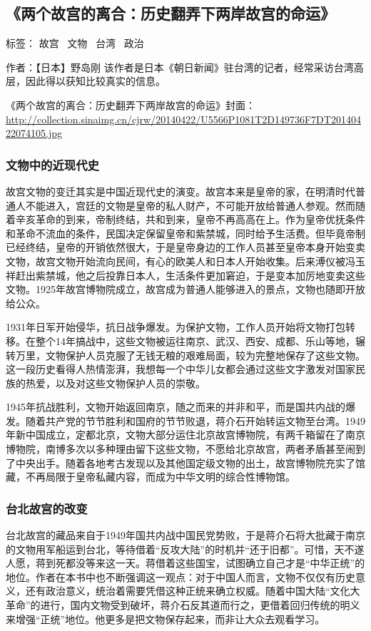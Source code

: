 \subsection{《两个故宫的离合：历史翻弄下两岸故宫的命运》}

标签： 故宫 \  文物 \  台湾 \  政治

作者：【日本】野岛刚
该作者是日本《朝日新闻》驻台湾的记者，经常采访台湾高层，因此得以获知比较真实的信息。

《两个故宫的离合：历史翻弄下两岸故宫的命运》封面：\url{http://collection.sinaimg.cn/cjrw/20140422/U5566P1081T2D149736F7DT20140422074105.jpg}

\subsubsection{文物中的近现代史}
故宫文物的变迁其实是中国近现代史的演变。故宫本来是皇帝的家，在明清时代普通人不能进入，宫廷的文物是皇帝的私人财产，不可能开放给普通人参观。然而随着辛亥革命的到来，帝制终结，共和到来，皇帝不再高高在上。作为皇帝优抚条件和革命不流血的条件，民国决定保留皇帝和紫禁城，同时给予生活费。但毕竟帝制已经终结，皇帝的开销依然很大，于是皇帝身边的工作人员甚至皇帝本身开始变卖文物，故宫文物开始流向民间，有心的欧美人和日本人开始收集。后来溥仪被冯玉祥赶出紫禁城，他之后投靠日本人，生活条件更加窘迫，于是变本加厉地变卖这些文物。1925年故宫博物院成立，故宫成为普通人能够进入的景点，文物也随即开放给公众。

1931年日军开始侵华，抗日战争爆发。为保护文物，工作人员开始将文物打包转移。在整个14年搞战中，这些文物被运往南京、武汉、西安、成都、乐山等地，辗转万里，文物保护人员克服了无钱无粮的艰难局面，较为完整地保存了这些文物。这一段历史看得人热情澎湃，我想每一个中华儿女都会通过这些文字激发对国家民族的热爱，以及对这些文物保护人员的崇敬。

1945年抗战胜利，文物开始返回南京，随之而来的并非和平，而是国共内战的爆发。随着共产党的节节胜利和国府的节节败退，蒋介石开始转运文物至台湾。1949年新中国成立，定都北京，文物大部分运住北京故宫博物院，有两千箱留在了南京博物院，南博多次以多种理由留下这些文物，不愿给北京故宫，两者矛盾甚至闹到了中央出手。随着各地考古发现以及其他国定级文物的出土，故宫博物院充实了馆藏，不再局限于皇帝私藏内容，而成为中华文明的综合性博物馆。

\subsubsection{台北故宫的改变}
台北故宫的藏品来自于1949年国共内战中国民党势败，于是蒋介石将大批藏于南京的文物用军船运到台北，等待借着“反攻大陆”的时机并“还于旧都”。可惜，天不遂人愿，蒋到死都没等来这一天。蒋借着这些国宝，试图确立自己才是“中华正统”的地位。作者在本书中也不断强调这一观点：对于中国人而言，文物不仅仅有历史意义，还有政治意义，统治着需要凭借这种正统来确立权威。随着中国大陆“文化大革命”的进行，国内文物受到破坏，蒋介石反其道而行之，更借着回归传统的明义来增强“正统”地位。他更多是把文物保存起来，而非让大众去观看学习。

